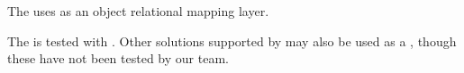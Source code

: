 The \ite{}  uses  as an object relational mapping layer. 


The \ite{} is tested with .
Other \gddb{} solutions supported by  may also be 
used as a \gddb{}, though these have not been tested by our team. 



